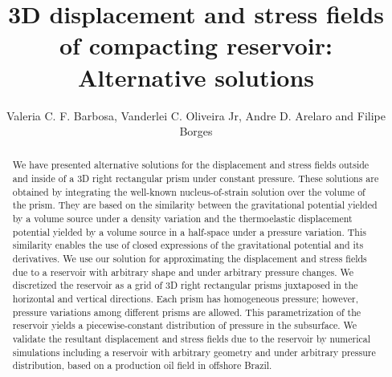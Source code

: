 \documentclass[P]{BrJG_submit}
\title{3D displacement and stress fields of compacting reservoir:  Alternative solutions}
\author{Valeria C. F. Barbosa,\affil{1} Vanderlei C. Oliveira Jr,\affil{1}
Andre D. Arelaro\affil{1,2} and Filipe Borges\affil{2} }
\begin{document}



%
\begin{abstract}
We have presented alternative solutions for the displacement and stress fields outside and inside of a 3D right rectangular prism  under constant pressure. These solutions are obtained by integrating the well-known nucleus-of-strain solution over the volume of the prism. They are based on the similarity between the gravitational potential yielded by a volume source under a density variation and the thermoelastic displacement potential yielded by a volume source in a half-space under a pressure variation. This similarity enables the use of closed expressions of the gravitational potential 
and its derivatives. We use our solution for approximating the displacement and stress fields
due to a reservoir with arbitrary shape and under arbitrary pressure changes.
We discretized the reservoir as a grid of 3D right rectangular prisms  juxtaposed in the horizontal and vertical directions. Each prism has homogeneous pressure; however, pressure variations among different prisms are allowed.  This parametrization of the reservoir yields a piecewise-constant distribution of pressure in the subsurface.  We validate the resultant displacement and stress fields due to the reservoir by numerical simulations including a reservoir with arbitrary geometry and under arbitrary pressure distribution, based on a production oil field in offshore Brazil.
\end{abstract}
\end{document}
